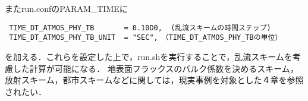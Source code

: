 またrun.confのPARAM\_TIMEに

\begin{verbatim}
 TIME_DT_ATMOS_PHY_TB       = 0.10D0,  (乱流スキームの時間ステップ)
 TIME_DT_ATMOS_PHY_TB_UNIT  = "SEC",　（TIME_DT_ATMOS_PHY_TBの単位）
\end{verbatim}

を加える．これらを設定した上で，run.shを実行することで，乱流スキームを考慮した計算が可能になる．
地表面フラックスのバルク係数を決めるスキーム，放射スキーム，都市スキームなどに関しては，現実事例を対象とした４章を参照されたい．


%
%
%
%



